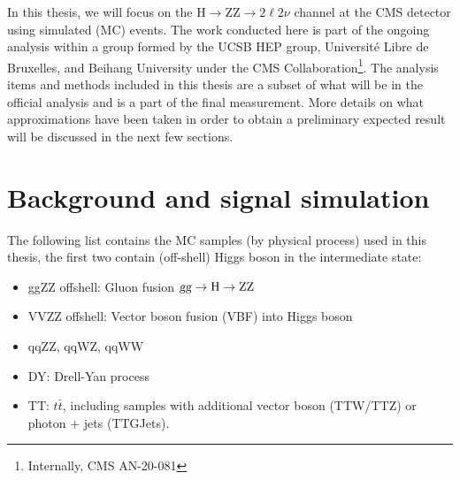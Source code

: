 In this thesis, we will focus on the $\mathrm{H} \rightarrow \mathrm{ZZ} \rightarrow 2\ell2\nu$ channel
at the CMS detector using simulated (MC) events. The work conducted here is part of the ongoing analysis
within a group formed by the UCSB HEP group, Universit\'e Libre de Bruxelles, and Beihang University under
the CMS Collaboration\footnote{Internally, CMS AN-20-081}. The analysis items and methods included in this
thesis are a subset of what will be in the official analysis and is a part of the final measurement. More
details on what approximations have been taken in order to obtain a preliminary expected result will be discussed
in the next few sections.



\section{Background and signal simulation}




The following list contains the MC samples (by physical process) used in this thesis, the first two
contain (off-shell) Higgs boson in the intermediate state:
\begin{itemize}
\item ggZZ offshell: Gluon fusion $\textsl{g}\textsl{g} \rightarrow\mathrm{H}\rightarrow\mathrm{ZZ}$
\item VVZZ offshell: Vector boson fusion (VBF) into Higgs boson
\item qqZZ, qqWZ, qqWW
\item DY: Drell-Yan process
\item TT: $t\bar{t}$, including samples with additional vector boson (TTW/TTZ) or photon + jets (TTGJets).
\end{itemize}


